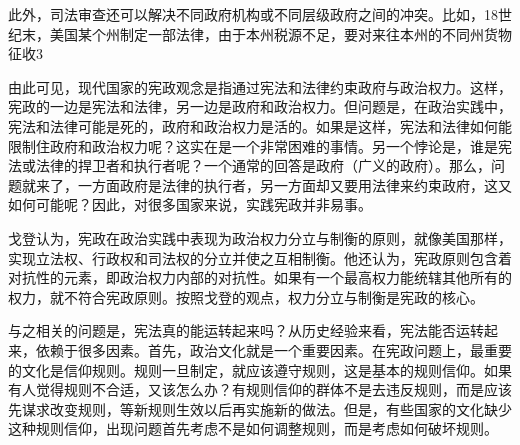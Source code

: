 此外，司法审查还可以解决不同政府机构或不同层级政府之间的冲突。比如，18世纪末，美国某个州制定一部法律，由于本州税源不足，要对来往本州的不同州货物征收3%


由此可见，现代国家的宪政观念是指通过宪法和法律约束政府与政治权力。这样，宪政的一边是宪法和法律，另一边是政府和政治权力。但问题是，在政治实践中，宪法和法律可能是死的，政府和政治权力是活的。如果是这样，宪法和法律如何能限制住政府和政治权力呢？这实在是一个非常困难的事情。另一个悖论是，谁是宪法或法律的捍卫者和执行者呢？一个通常的回答是政府（广义的政府）。那么，问题就来了，一方面政府是法律的执行者，另一方面却又要用法律来约束政府，这又如何可能呢？因此，对很多国家来说，实践宪政并非易事。

戈登认为，宪政在政治实践中表现为政治权力分立与制衡的原则，就像美国那样，实现立法权、行政权和司法权的分立并使之互相制衡。他还认为，宪政原则包含着对抗性的元素，即政治权力内部的对抗性。如果有一个最高权力能统辖其他所有的权力，就不符合宪政原则。按照戈登的观点，权力分立与制衡是宪政的核心。

与之相关的问题是，宪法真的能运转起来吗？从历史经验来看，宪法能否运转起来，依赖于很多因素。首先，政治文化就是一个重要因素。在宪政问题上，最重要的文化是信仰规则。规则一旦制定，就应该遵守规则，这是基本的规则信仰。如果有人觉得规则不合适，又该怎么办？有规则信仰的群体不是去违反规则，而是应该先谋求改变规则，等新规则生效以后再实施新的做法。但是，有些国家的文化缺少这种规则信仰，出现问题首先考虑不是如何调整规则，而是考虑如何破坏规则。

